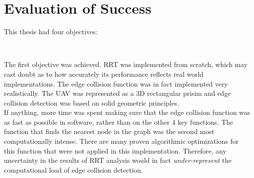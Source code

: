     \begin{table}[H]
    \begin{center}
    \begin{tabular}{|c|c|}
    
    \end{tabular}
    \end{center}
    \end{table}

\section{Evaluation of Success}
    This thesis had four objectives:

    \begin{center}
    \bigskip\noindent{} \\
    \end{center}

    The first objective was achieved. \gls{RRT} was implemented from scratch, which may cast doubt as to how accurately its performance reflects real world implementations. The edge collision function was in fact implemented very realistically. The \gls{UAV} was represented as a 3D rectangular prisim and edge collision detection was based on solid geometric principles. \\
    If anything, more time was spent making sure that the edge collision function was as fast as possible in software, rather than on the other 4 key functions. The function that finds the nearest node in the graph was the second most computationally intense. There are many proven algorithmic optimizations for this function that were not applied in this implementation. Therefore, any uncertainty in the results of \gls{RRT} analysis would in fact \textit{under-represent} the computational load of edge collision detection. \\

